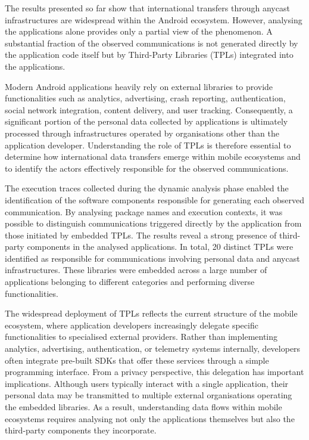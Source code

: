 The results presented so far show that international transfers through anycast infrastructures are widespread within the Android ecosystem. However, analysing the applications alone provides only a partial view of the phenomenon. A substantial fraction of the observed communications is not generated directly by the application code itself but by Third-Party Libraries (TPLs) integrated into the applications.

Modern Android applications heavily rely on external libraries to provide functionalities such as analytics, advertising, crash reporting, authentication, social network integration, content delivery, and user tracking. Consequently, a significant portion of the personal data collected by applications is ultimately processed through infrastructures operated by organisations other than the application developer. Understanding the role of TPLs is therefore essential to determine how international data transfers emerge within mobile ecosystems and to identify the actors effectively responsible for the observed communications.

The execution traces collected during the dynamic analysis phase enabled the identification of the software components responsible for generating each observed communication. By analysing package names and execution contexts, it was possible to distinguish communications triggered directly by the application from those initiated by embedded TPLs. The results reveal a strong presence of third-party components in the analysed applications. In total, 20 distinct TPLs were identified as responsible for communications involving personal data and anycast infrastructures. These libraries were embedded across a large number of applications belonging to different categories and performing diverse functionalities.

The widespread deployment of TPLs reflects the current structure of the mobile ecosystem, where application developers increasingly delegate specific functionalities to specialised external providers. Rather than implementing analytics, advertising, authentication, or telemetry systems internally, developers often integrate pre-built SDKs that offer these services through a simple programming interface. From a privacy perspective, this delegation has important implications. Although users typically interact with a single application, their personal data may be transmitted to multiple external organisations operating the embedded libraries. As a result, understanding data flows within mobile ecosystems requires analysing not only the applications themselves but also the third-party components they incorporate.

